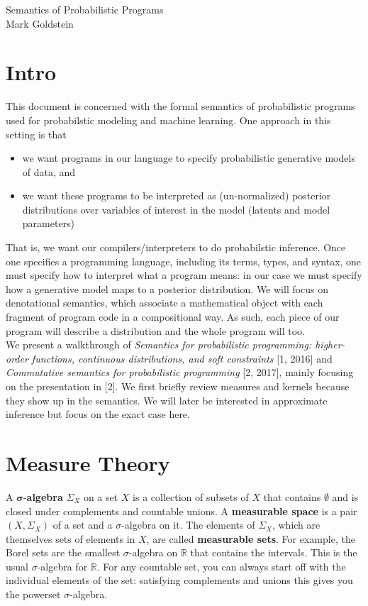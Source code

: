 \documentclass[11pt]{article}
\theoremstyle{definition}
\theoremstyle{plain}
\renewcommand{\b}[1]{\mathbb{#1}}
\begin{document}
\begin{center}
Semantics of Probabilistic Programs\\
Mark Goldstein
\end{center}

\section{Intro}

\noindent This document is concerned with the formal semantics of probabilistic programs used
for probabilstic modeling and machine learning. One approach in this setting is that 
\begin{itemize}
    \item we want programs in our language to specify probabilistic generative models of data, and 
    \item we want these programs to be interpreted as (un-normalized) posterior distributions over
          variables of interest in the model (latents and model parameters)
\end{itemize}
\noindent That is, we want our compilers/interpreters to do probabilstic inference. 
Once one specifies a programming language, including its terms, types, and syntax, one
must specify how to interpret what a program means: in our case we must
specify how a generative model maps to a posterior distribution.
We will focus on denotational semantics, which associate a mathematical object with each
fragment of program code in a compositional way. As such, each piece of our program
will describe a distribution and the whole program will too.\\

\noindent We present a walkthrough of \textit{Semantics for probabilistic programming: 
higher-order functions, continuous distributions, and soft constraints} [1, 2016]
and \textit{Commutative semantics for probabilistic programming} [2, 2017], 
mainly focusing on the presentation in [2]. We first briefly review measures and kernels because
they show up in the semantics. We will later be interested in approximate inference but focus
on the exact case here.

\section{Measure Theory}

\noindent A $\mathbf{\sigma}$-\textbf{algebra} $\Sigma_X$ on a set $X$ is a collection
of subsets of $X$ that contains $\emptyset$ and is closed under complements
and countable unions. A \textbf{measurable space} is a pair $(X,\Sigma_X)$ of
a set and a $\sigma$-algebra on it. The elements of $\Sigma_X$, which are themselves
sets of elements in $X$, are called \textbf{measurable sets}.
For example, the Borel sets are the smallest $\sigma$-algebra on $\b{R}$ that
contains the intervals. This is the usual $\sigma$-algebra for $\b{R}$. For any countable
set, you can always start off with the individual elements of the set: satisfying
complements and unions this gives you the powerset $\sigma$-algebra.\\
\end{document}
